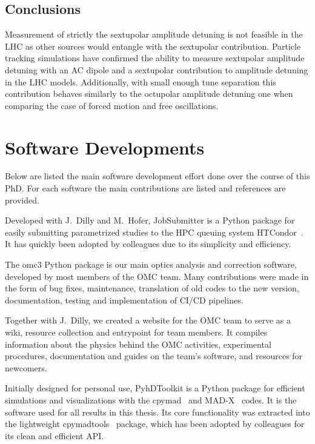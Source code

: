 \subsection*{Conclusions}

Measurement of strictly the sextupolar amplitude detuning is not feasible in the LHC as other sources would entangle with the sextupolar contribution.
Particle tracking simulations have confirmed the ability to measure sextupolar amplitude detuning with an AC dipole and a sextupolar contribution to amplitude detuning in the LHC models.
Additionally, with small enough tune separation this contribution behaves similarly to the octupolar amplitude detuning one when comparing the case of forced motion and free oscillations.

\section{Software Developments}
\label{section:code_developments}

Below are listed the main software development effort done over the course of this PhD.
For each software the main contributions are listed and references are provided.

Developed with J.~Dilly and M.~Hofer, JobSubmitter is a Python package for easily submitting parametrized studies to the HPC queuing system HTCondor~\cite{CODE:Douglas:condor-practice}.
It has quickly been adopted by colleagues due to its simplicity and efficiency.

The omc3 Python package is our main optics analysis and correction software, developed by most members of the OMC team.
Many contributions were made in the form of bug fixes, maintenance, translation of old codes to the new version, documentation, testing and implementation of CI/CD pipelines.

Together with J.~Dilly, we created a website for the OMC team to serve as a wiki, resource collection and entrypoint for team members.
It compiles information about the physics behind the OMC activities, experimental procedures, documentation and guides on the team's software, and resources for newcomers.

Initially designed for personal use, PyhDToolkit is a Python package for efficient simulations and visualizations with the cpymad~\cite{CODE:HIBTC:cpymad} and MAD-X~\cite{CODE:MADX_guide} codes.
It is the software used for all results in this thesis.
Its core functionality was extracted into the lightweight cpymadtools~\cite{CODE:Soubelet:cpymadtools} package, which has been adopted by colleagues for its clean and efficient API.

